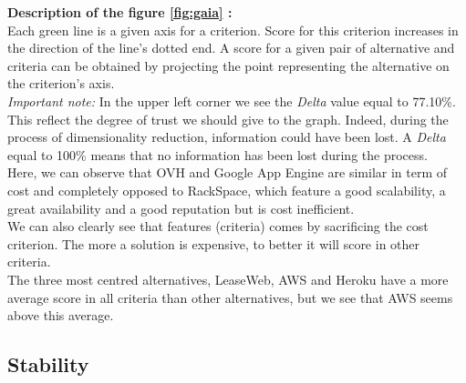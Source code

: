 \documentclass[a4paper,11pt]{article}
\begin{document}
\textbf{Description of the figure \ref{fig:gaia} :}\\

Each green line is a given axis for a criterion. Score for this criterion increases in the direction of the line's dotted end. A score for a given pair of alternative and criteria can be obtained by projecting the point representing the alternative on the criterion's axis. \\

\emph{Important note: } In the upper left corner we see the \textit{Delta} value equal to 77.10\%. This reflect the degree of trust we should give to the graph. Indeed, during the process of dimensionality reduction, information could have been lost. A \textit{Delta} equal to 100\% means that no information has been lost during the process.\\

Here, we can observe that OVH and Google App Engine are similar in term of cost and completely opposed to RackSpace, which feature a good scalability, a great availability and a good reputation but is cost inefficient. \\

We can also clearly see that features (criteria) comes by sacrificing the \og cost \fg{} criterion. The more a solution is expensive, to better it will score in other criteria.\\

The three most centred alternatives, LeaseWeb, AWS and Heroku have a more average score in all criteria than other alternatives, but we see that AWS seems above this average.\\

\subsection{Stability}
\end{document}
